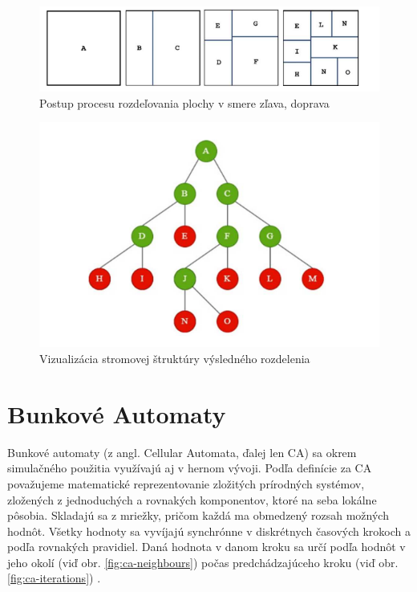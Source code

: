 \begin{figure}[H]
    \centering
    \includegraphics[width=0.5\linewidth]{obrazky-figures/bsp-squares.png}
    \caption{Postup procesu rozdeľovania plochy v smere zľava, doprava \cite{putra2023bsp}}
    \label{fig:bsp-proces}
\end{figure}

\begin{figure}[H]
    \centering
    \includegraphics[width=0.5\linewidth]{obrazky-figures/bsp-tree.png}
    \caption{Vizualizácia stromovej štruktúry výsledného rozdelenia \cite{putra2023bsp}}
    \label{fig:bsp-tree}
\end{figure}

\section{Bunkové Automaty} \label{sec:ca}

Bunkové automaty (z angl. Cellular Automata, ďalej len CA) sa okrem simulačného použitia využívajú aj v hernom vývoji. Podľa definície za CA považujeme matematické reprezentovanie zložitých prírodných systémov, zložených z jednoduchých a rovnakých komponentov, ktoré na seba lokálne pôsobia. Skladajú sa z mriežky, pričom každá ma obmedzený rozsah možných hodnôt. Všetky hodnoty sa vyvíjajú synchrónne v diskrétnych časových krokoch a podľa rovnakých pravidiel. Daná hodnota v danom kroku sa určí podľa hodnôt v jeho okolí (viď obr. \ref{fig:ca-neighbours}) počas predchádzajúceho kroku (viď obr. \ref{fig:ca-iterations}) \cite{wolfram1984universality}.

